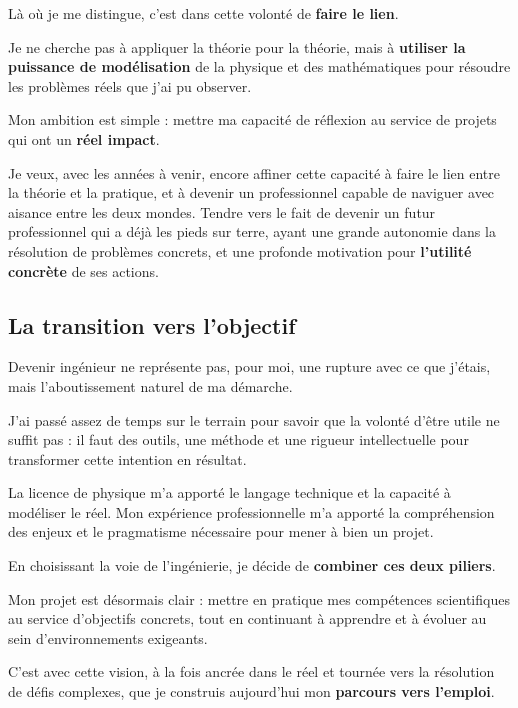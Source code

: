Là où je me distingue, 
c'est dans cette volonté de \textbf{faire le lien}. 

Je ne cherche pas à appliquer la théorie pour la théorie, 
mais à \textbf{utiliser la puissance de modélisation} de la physique et des mathématiques 
pour résoudre les problèmes réels que j'ai pu observer. 

Mon ambition est simple : 
mettre ma capacité de réflexion au service de projets qui ont un \textbf{réel impact}. 

Je veux, 
avec les années à venir, 
encore affiner cette capacité à faire le lien entre la théorie et la pratique,
et à devenir un professionnel capable de naviguer avec aisance entre les deux mondes.
Tendre vers le fait de devenir un futur professionnel qui a déjà les pieds sur terre, 
ayant une grande autonomie dans la résolution de problèmes concrets, 
et une profonde motivation pour \textbf{l'utilité concrète} de ses actions.

\subsection{La transition vers l'objectif}

Devenir ingénieur ne représente pas, pour moi, une rupture avec ce que j'étais, 
mais l'aboutissement naturel de ma démarche. 

J'ai passé assez de temps sur le terrain 
pour savoir que la volonté d'être utile ne suffit pas : 
il faut des outils, une méthode et une rigueur intellectuelle 
pour transformer cette intention en résultat.

La licence de physique m'a apporté le langage technique et la capacité à modéliser le réel. 
Mon expérience professionnelle m'a apporté la compréhension des enjeux 
et le pragmatisme nécessaire pour mener à bien un projet. 

En choisissant la voie de l'ingénierie, 
je décide de \textbf{combiner ces deux piliers}. 

Mon projet est désormais clair : 
mettre en pratique mes compétences scientifiques au service d'objectifs concrets, 
tout en continuant à apprendre et à évoluer au sein d'environnements exigeants. 

C'est avec cette vision, 
à la fois ancrée dans le réel et tournée vers la résolution de défis complexes, 
que je construis aujourd'hui mon \textbf{parcours vers l'emploi}.
